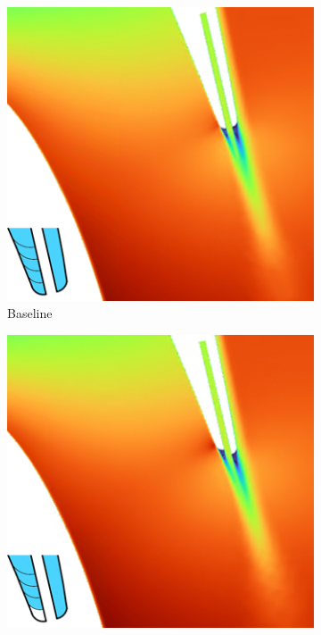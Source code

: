 \documentclass[a4paper, 11pt, oneside]{report}
\begin{document}
\begin{figure}[H]
	\centering
	\begin{subfigure}{.42\textwidth}
		\centering
		\includegraphics[width=\linewidth]{figs/ps_cutbacks_design_0.png}
		\caption{Baseline}
		\vspace{0.018\textheight}
	\end{subfigure}
	\hspace{0.05\textwidth}
	\begin{subfigure}{.42\textwidth}
		\centering
		\includegraphics[width=\linewidth]{figs/ps_cutbacks_design_25.png}

\end{subfigure}
\end{figure}
\end{document}
